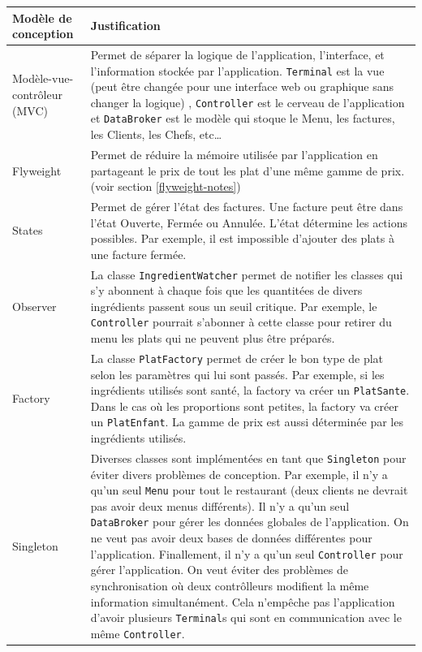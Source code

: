 \documentclass[a11paper, 11pt]{article}
\begin{document}
\begin{table}[H]
\caption{Justification des modèles de conception}
\begin{longtable}{lp{10cm}}
\toprule
\textbf{Modèle de conception} & \textbf{Justification} \\

\midrule
Modèle-vue-contrôleur (MVC) &
Permet de séparer la logique de l'application, l'interface, et l'information
stockée par l'application. \verb|Terminal| est la vue (peut être changée pour
une interface web ou graphique sans changer la logique) , \verb|Controller| est
le cerveau de l'application et \verb|DataBroker| est le modèle qui stoque le Menu,
les factures, les Clients, les Chefs, etc\ldots \\

\midrule
Flyweight &
Permet de réduire la mémoire utilisée par l'application en
partageant le prix de tout les plat d'une même gamme de prix. (voir section
\ref{flyweight-notes}) \\

\midrule
States &
Permet de gérer l'état des factures. Une facture peut être
dans l'état Ouverte, Fermée ou Annulée. L'état détermine les actions possibles.
Par exemple, il est impossible d'ajouter des plats à une facture fermée. \\

\midrule
Observer &
La classe \verb|IngredientWatcher| permet de notifier les classes qui s'y
abonnent à chaque fois que les quantitées de divers ingrédients passent sous un
seuil critique. Par exemple, le \verb|Controller| pourrait s'abonner à cette
classe pour retirer du menu les plats qui ne peuvent plus être préparés. \\

\midrule
Factory&
La classe \verb|PlatFactory| permet de créer le bon type de plat selon les
paramètres qui lui sont passés. Par exemple, si les ingrédients utilisés sont
santé, la factory va créer un \verb|PlatSante|. Dans le cas où les proportions
sont petites, la factory va créer un \verb|PlatEnfant|. La gamme de prix est
aussi déterminée par les ingrédients utilisés. \\

\midrule
Singleton&

Diverses classes sont implémentées en tant que \verb|Singleton| pour éviter
divers problèmes de conception. Par exemple, il n'y a qu'un seul \verb|Menu|
pour tout le restaurant (deux clients ne devrait pas avoir deux menus
différents). Il n'y a qu'un seul \verb|DataBroker| pour gérer les données
globales de l'application. On ne veut pas avoir deux bases de données
différentes pour l'application. Finallement, il n'y a qu'un seul
\verb|Controller| pour gérer l'application. On veut éviter des problèmes de
synchronisation où deux contrôlleurs modifient la même information
simultanément. Cela n'empêche pas l'application d'avoir plusieurs
\verb|Terminal|s qui sont en communication avec le même \verb|Controller|. \\

\bottomrule

\end{longtable}
\end{table}
\end{document}
